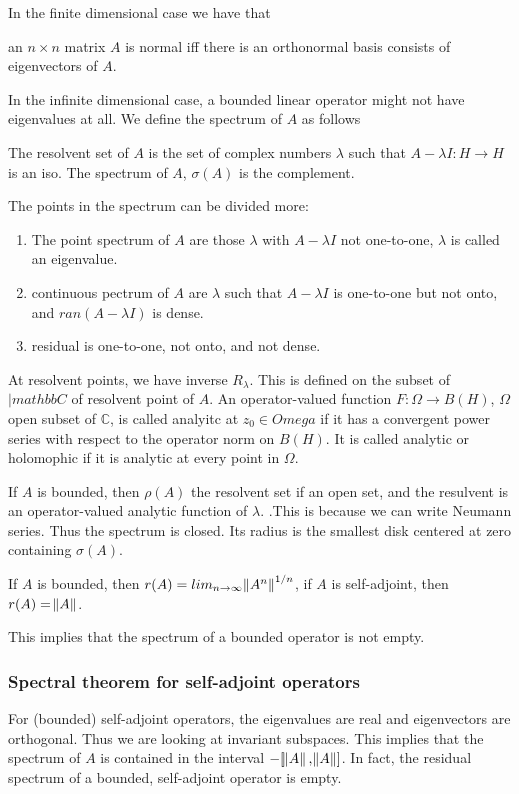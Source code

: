 \documentclass[main.tex]{subfiles}
\begin{document}
In the finite dimensional case we have that 
\begin{theorem}
an $n \times n$ matrix $A$ is normal iff there is an orthonormal basis consists of eigenvectors of $A$.
\end{theorem}

In the infinite dimensional case, a bounded linear operator might not have eigenvalues at all. We define the spectrum of $A$ as follows
\begin{definition}
The resolvent set of $A$ is the set of complex numbers $\lambda$ such that $A - \lambda I: H \rightarrow H$ is an iso. The spectrum of $A$, $\sigma(A)$ is the complement.
\end{definition}

The points in the spectrum can be divided more:
\begin{definition}
\begin{enumerate}
    \item The point spectrum of $A$ are those $\lambda$ with $A - \lambda I$ not one-to-one, $\lambda$ is called an eigenvalue.
    \item continuous pectrum of $A$ are $\lambda$ such that $A - \lambda I$ is one-to-one but not onto, and $ran(A - \lambda I)$ is dense.
    \item residual is one-to-one, not onto, and not dense.
\end{enumerate}
\end{definition}
At resolvent points, we have inverse $R_\lambda$. This is defined on the subset of $|mathbb{C}$ of resolvent point of $A$. An operator-valued function $F: \Omega \rightarrow B(H)$, $\Omega$ open subset of $\mathbb{C}$, is called analyitc at $z_0 \in Omega$ if it has a convergent power series with respect to the operator norm on $B(H)$. It is called analytic or holomophic if it is analytic at every point in $\Omega$.

If $A$ is bounded, then $\rho(A)$ the resolvent set if an open set, and the resulvent is an operator-valued analytic function of $\lambda$. .This is because we can write Neumann series. Thus the spectrum is closed. Its radius is the smallest disk centered at zero containing $\sigma(A)$.

If $A$ is bounded, then $r(A) = lim_{n \rightarrow \infty} \norm{A^n}^{1/n}$, if $A$ is self-adjoint, then $r(A) = \norm{A}$.

This implies that the spectrum of a bounded operator is not empty.

\subsubsection{Spectral theorem for self-adjoint operators}
For (bounded) self-adjoint operators, the eigenvalues are real and eigenvectors are orthogonal.
Thus we are looking at invariant subspaces. This implies that the spectrum of $A$ is contained in the interval $-[\norm{A}, \norm{A}]$. In fact, the residual spectrum of a bounded, self-adjoint operator is empty.
\end{document}
